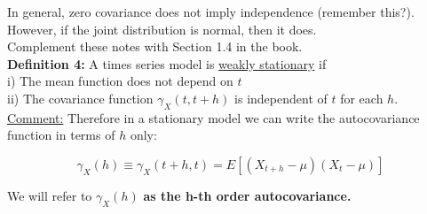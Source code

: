 \documentclass[12] {article}
\begin{document}
In general, zero covariance does not imply independence (remember this?). However, if the joint distribution is normal, then it does. \\

Complement these notes with Section 1.4 in the book. \\

\noindent \textbf{Definition 4:} A times series model is \underline{weakly stationary} if \\

i) The mean function does not depend on $t$ \\

ii) The covariance function $\gamma_{X}(t,t+h)$ is independent of $t$ for each $h$. \\

\noindent \underline{Comment:} Therefore in a stationary model we can write the autocovariance function in terms of $h$ only:

\[ \gamma_{X}(h) \equiv \gamma_{X} (t+ h, t) = E[(X_{t+h} - \mu)(X_t - \mu) ]\]


\noindent We will refer to $\gamma_{X}(h)$  \textbf{as the h-th order autocovariance.} \\
\end{document}
